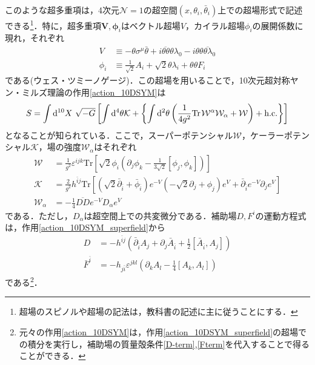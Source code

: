 \documentclass[a4paper,uplatex,dvipdfmx]{jsarticle}
\theoremstyle{definition}
\begin{document}
このような超多重項は，4次元$\mathcal{N}=1$の超空間$(x,\theta_{i},\bar{\theta}_{i})$上での超場形式で記述できる\footnote{
   超場のスピノルや超場の記法は，教科書\cite{Wess_SupersymmetrySupergravity_1992}の記述に主に従うことにする．
}．特に，超多重項$\bm{V},\bm{\phi}_{i}$はベクトル超場$V$，カイラル超場$\phi_{i}$の展開係数に現れ，それぞれ
\begin{align}
   V
   &\equiv
   -
   \theta\sigma^{\mu}\bar{\theta}
   +
   i\overline{\theta\theta}\theta\lambda_{0}
   -
   i\theta\theta\overline{\theta\lambda}_{0}
   \nonumber
   \\
   \phi_{i}
   &\equiv
   \frac{1}{\sqrt{2}}A_{i}
   +
   \sqrt{2}\theta\lambda_{i}
   +
   \theta\theta F_{i}
   \nonumber
\end{align}
である(ウェス・ツミーノゲージ)．この超場を用いることで，10次元超対称ヤン・ミルズ理論の作用\eqref{action_10DSYM}は
\begin{equation}
   S
   =
   \int\dd^{10} X\ \sqrt{-G}
   \left[  
      \int\dd^4\theta
      \mathcal{K}
      +
      \left\{  
         \int\dd^2\theta
         \left(  
            \frac{1}{4g^2}\text{Tr\hspace*{1pt}}\mathcal{W^{\alpha}\mathcal{W}_{\alpha}}
            +
            \mathcal{W}
         \right)
         +
         \text{h.c.}
      \right\}
   \right]
   \label{action_10DSYM_superfield}
\end{equation}
となることが知られている\cite{Arkani-Hamed_HigherDimensional_2002}．ここで，スーパーポテンシャル$\mathcal{W}$，ケーラーポテンシャル$\mathcal{K}$，場の強度$\mathcal{W}_{\alpha}$はそれぞれ
\begin{align}
   \mathcal{W}
   &=
   \frac{1}{g^2}\varepsilon^{ijk}\text{Tr}
   \left[  
      \sqrt{2}\phi_{i}
      \left(  
         \partial_{j}\phi_{k}
         -
         \frac{1}{3\sqrt{2}}[\phi_{j},\phi_{k}]
      \right)
   \right]
   \nonumber
   \\
   \mathcal{K}
   &=
   \frac{2}{g^2}h^{\bar{i}j}
   \text{Tr}
   \left[  
      (\sqrt{2}\bar{\partial}_{\bar{i}}+\bar{\phi}_{\bar{i}})e^{-V}
      (-\sqrt{2}\partial_{j}+\phi_{j})e^{V}
      +
      \bar{\partial}_{\bar{i}}e^{-V}\partial_{j}e^{V}
   \right]
   \nonumber
   \\
   \mathcal{W}_{\alpha}
   &=
   -
   \frac{1}{4}\overline{DD}e^{-V}D_{\alpha}e^{V}
   \nonumber
\end{align}
である．ただし，$D_{\alpha}$は超空間上での共変微分である．補助場$D,F^{i}$の運動方程式は，作用\eqref{action_10DSYM_superfield}から
\begin{align}
   D
   &=
   -
   h^{\bar{i}j}
   \left(  
      \bar{\partial}_{\bar{i}}A_{j}
      +
      \partial_{j}\bar{A}_{\bar{i}}
      +
      \frac{1}{2}[\bar{A}_{\bar{i}},A_{j}]
   \right)
   \label{D-term}
   \\
   \bar{F}^{\bar{i}}
   &=
   -h_{j\bar{i}}
   \varepsilon^{jkl}
   \left(  
      \partial_{k}A_{l}
      -
      \frac{1}{4}[A_{k},A_{l}]
   \right)
   \label{Fterm}
\end{align}
である\footnote{
   元々の作用\eqref{action_10DSYM}は，作用\eqref{action_10DSYM_superfield}の超場での積分を実行し，補助場の質量殻条件\eqref{D-term},\eqref{Fterm}を代入することで得ることができる\cite{Abe_SuperfieldDescription_2012}．
}．
\end{document}
